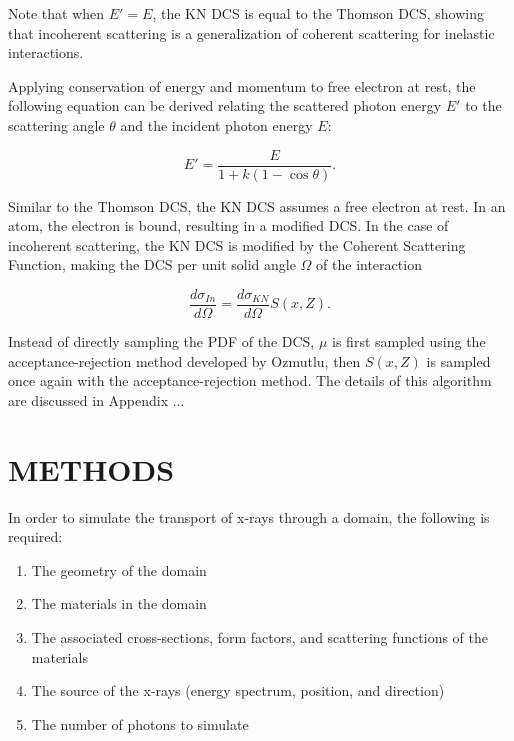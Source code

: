 \documentclass[%
 aip,
cp,  %
 amsmath,amssymb,%
reprint,%
]{revtex4-2}
\begin{document}
\par Note that when $E' = E$, the KN DCS is equal to the Thomson DCS, showing that incoherent scattering is a generalization of coherent scattering for inelastic interactions. \\

\par Applying conservation of energy and momentum to free electron at rest, the following equation can be derived relating the scattered photon energy $E'$ to the scattering angle $\theta$ and the incident photon energy $E$:

\begin{equation}
    E' = \frac{E}{1 + k(1 - \cos \theta)}.
\end{equation}

\par Similar to the Thomson DCS, the KN DCS assumes a free electron at rest. In an atom, the electron is bound, resulting in a modified DCS. In the case of incoherent scattering, the KN DCS is modified by the Coherent Scattering Function, making the DCS per unit solid angle $\Omega$ of the interaction

\begin{equation}
    \frac{d\sigma_{In}}{d\Omega} = \frac{d\sigma_{KN}}{d\Omega} S(x, Z).
\end{equation}


Instead of directly sampling the PDF of the DCS, $\mu$ is first sampled using the acceptance-rejection method developed by Ozmutlu, then $S(x, Z)$ is sampled once again with the acceptance-rejection method. The details of this algorithm are discussed in Appendix ... \\




\section{METHODS}

In order to simulate the transport of x-rays through a domain, the following is required:

\begin{enumerate}
    \item The geometry of the domain
    \item The materials in the domain
    \item The associated cross-sections, form factors, and scattering functions of the materials
    \item The source of the x-rays (energy spectrum, position, and direction)
    \item The number of photons to simulate
\end{enumerate}
\end{document}
